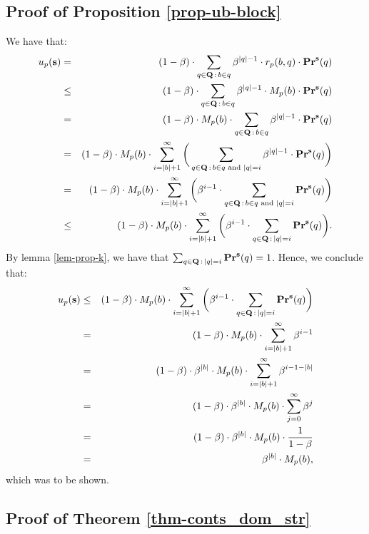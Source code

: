 \subsection{Proof of Proposition \ref{prop-ub-block}}
We have that:
\begin{eqnarray*}
u_p(\mathbf{s} ) & =  & (1 - \beta) \cdot  \sum_{q \in \mathbf{Q} \,:\, b \in q} \beta^{|q|-1} \cdot  r_p(b,q) \cdot \mathbf{Pr}^{\mathbf{s}}(q )\\
& \leq & (1 - \beta) \cdot  \sum_{q \in \mathbf{Q} \,:\, b \in q} \beta^{|q|-1} \cdot  M_p(b) \cdot \mathbf{Pr}^{\mathbf{s}}(q )\\
& = & (1 - \beta) \cdot  M_p(b) \cdot \sum_{q \in \mathbf{Q} \,:\, b \in q} \beta^{|q|-1} \cdot   \mathbf{Pr}^{\mathbf{s}}(q )\\
& = & (1 - \beta) \cdot  M_p(b) \cdot \sum_{i=|b|+1}^\infty \bigg(\sum_{q \in \mathbf{Q} \,:\, b \in q \text{ and } |q| = i} \beta^{|q|-1} \cdot   \mathbf{Pr}^{\mathbf{s}}(q )\bigg)\\
& = & (1 - \beta) \cdot  M_p(b) \cdot \sum_{i=|b|+1}^\infty \bigg(\beta^{i-1} \cdot \sum_{q \in \mathbf{Q} \,:\, b \in q \text{ and } |q| = i} \mathbf{Pr}^{\mathbf{s}}(q )\bigg)\\
& \leq & (1 - \beta) \cdot  M_p(b) \cdot \sum_{i=|b|+1}^\infty \bigg(\beta^{i-1} \cdot \sum_{q \in \mathbf{Q} \,:\, |q| = i} \mathbf{Pr}^{\mathbf{s}}(q )\bigg).
\end{eqnarray*}
By lemma \ref{lem-prop-k}, we have that $\sum_{q \in \mathbf{Q} \,:\, |q| = i} \mathbf{Pr}^{\mathbf{s}}(q ) = 1$. Hence, we conclude that:
\begin{eqnarray*}
u_p(\mathbf{s} ) & \leq & (1 - \beta) \cdot  M_p(b) \cdot \sum_{i=|b|+1}^\infty \bigg(\beta^{i-1} \cdot \sum_{q \in \mathbf{Q} \,:\, |q| = i} \mathbf{Pr}^{\mathbf{s}}(q )\bigg)\\
& = & (1 - \beta) \cdot  M_p(b) \cdot \sum_{i=|b|+1}^\infty \beta^{i-1}\\
& = & (1 - \beta) \cdot  \beta^{|b|} \cdot M_p(b) \cdot  \sum_{i=|b|+1}^\infty \beta^{i-1-|b|}\\
& = & (1 - \beta) \cdot  \beta^{|b|} \cdot M_p(b) \cdot \sum_{j=0}^\infty \beta^{j}\\
& = & (1 - \beta) \cdot  \beta^{|b|} \cdot M_p(b) \cdot \frac{1}{1-\beta}\\
& = & \beta^{|b|} \cdot M_p(b), 
\end{eqnarray*}
which was to be shown. 

\subsection*{Proof of Theorem \ref{thm-conts_dom_str}}

